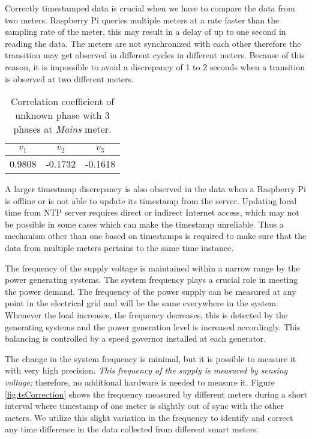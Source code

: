 Correctly timestamped data is crucial when we have to compare the data from two meters. {Raspberry Pi }queries multiple meters at a rate faster than the sampling rate of the meter, this may result in a delay of up to one second in reading the data. The meters are not synchronized with each other therefore the transition may get observed in different cycles in different meters. Because of this reason, it is impossible to avoid a discrepancy of 1 to 2 seconds when a transition is observed at two different meters.


\begin{table}[h]
		\centering
		\caption{Correlation coefficient of unknown phase with 3 phases at \textit{Mains} meter.}
		\begin{tabular}{ccc}
			\hline
			$v_1$ & $v_2$ & $v_3$  \\
			\hline
			0.9808 & -0.1732 & -0.1618 \\
			\hline
		\end{tabular}
		\label{tab:corr_coef}
	\end{table}

	A larger timestamp discrepancy is also observed in the data when a Raspberry Pi is offline or is not able to update its timestamp from the server. Updating local time from NTP server requires direct or indirect Internet access, which may not be possible in some cases which can make the timestamp unreliable. Thus a mechanism other than one based on timestamps is required to make sure that the data from multiple meters pertains to the same time instance.

 The frequency of the supply voltage is maintained within a narrow range by the power generating systems. The system frequency plays a crucial role in meeting the power demand. The frequency of the power supply can be measured at any point in the electrical grid and will be the same everywhere  in the system. Whenever the load increases, the frequency decreases, this is detected by the generating systems and the power generation level is increased accordingly. This balancing is controlled by a speed governor installed at each generator.

	The change in the system frequency is minimal, but it is possible to measure it with very high precision. \textit{This frequency of the supply is measured by sensing voltage;} therefore, no additional hardware is needed to measure it. Figure \ref{fig:tsCorrection} shows the frequency measured by different meters during a short interval where timestamp of one meter is slightly out of sync with the other meters. We utilize this slight variation in the frequency to identify and correct any time difference in the data collected from different smart meters.

